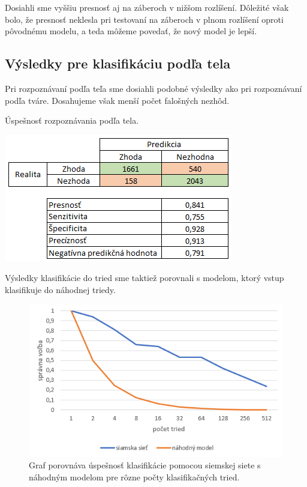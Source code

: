 Dosiahli sme vyššiu presnosť aj na záberoch v nižšom rozlíšení. 
Dôležité však bolo, že presnosť neklesla pri testovaní na záberoch v plnom rozlíšení oproti pôvodnému modelu, a teda môžeme povedať, že nový model je lepší.




\subsection{Výsledky pre klasifikáciu podľa tela}
Pri rozpoznávaní podľa teľa sme dosiahli podobné výsledky ako pri rozpoznávaní podľa tváre.
Dosahujeme však menší počet falošných nezhôd.
\begin{table}[H]
  \caption[Úspešnosť rozpoznávania podľa tela]{Úspešnosť rozpoznávania podľa tela.}
  \label{tbl:body1_table}
  \begin{center}
  \includegraphics{images/body1_table}
  \end{center}
\end{table}

Výsledky klasifikácie do tried sme taktiež porovnali s modelom, ktorý vstup klasifikuje do náhodnej triedy.

\begin{figure}[H]
\centerline{\includegraphics[width=1\textwidth]{images/graph_oneshot_body.png}}
\caption[Výsledky klasifikácie podľa tela]{Graf porovnáva úspešnosť klasifikácie pomocou siemskej siete s náhodným modelom pre rôzne počty klasifikačných tried.}
\label{obr:graph_oneshot_body}
\end{figure}


